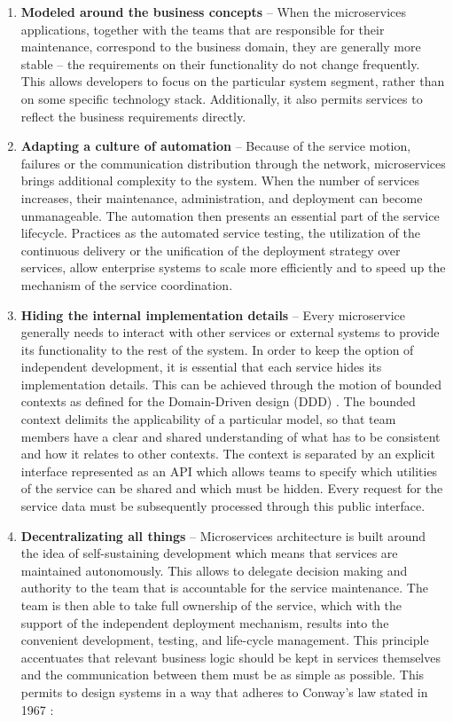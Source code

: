 \documentclass[oneside,
  digital, %
  table,   %
  lof,     %
  lot,     %
]{fithesis3}
\begin{document}
\begin{enumerate}
	
	\item \textbf{Modeled around the business concepts} -- When the microservices applications, together with the teams that are responsible for their maintenance, correspond to the business domain, they are generally more stable -- the requirements on their functionality do not change frequently. This allows developers to focus on the particular system segment, rather than on some specific technology stack. Additionally, it also permits services to reflect the business requirements directly.
	
	\item \textbf{Adapting a culture of automation} -- Because of the service motion, failures or the communication distribution through the network, microservices brings additional complexity to the system. When the number of services increases, their maintenance, administration, and deployment can become unmanageable. The automation then presents an essential part of the service lifecycle. Practices as the automated service testing, the utilization of the continuous delivery or the unification of the deployment strategy over services, allow enterprise systems to scale more efficiently and to speed up the mechanism of the service coordination.
	
	\item \textbf{Hiding the internal implementation details} -- Every microservice generally needs to interact with other services or external systems to provide its functionality to the rest of the system. In order to keep the option of independent development, it is essential that each service hides its implementation details. This can be achieved through the motion of bounded contexts as defined for the Domain-Driven design (DDD) \cite{ddd}. The bounded context delimits the applicability of a particular model, so that team members have a clear and shared understanding of what has to be consistent and how it relates to other contexts. The context is separated by an explicit interface represented as an API which allows teams to specify which utilities of the service can be shared and which must be hidden. Every request for the service data must be subsequently processed through this public interface.
	
	\item \textbf{Decentralizating all things} -- Microservices architecture is built around the idea of self-sustaining development which means that services are maintained autonomously. This allows to delegate decision making and authority to the team that is accountable for the service maintenance. The team is then able to take full ownership of the service, which with the support of the independent deployment mechanism, results into the convenient development, testing, and life-cycle management. This principle accentuates that relevant business logic should be kept in services themselves and the communication between them must be as simple as possible. This permits to design systems in a way that adheres to Conway's law  stated in 1967 \cite{conways_law}:
    

\end{enumerate}
\end{document}
